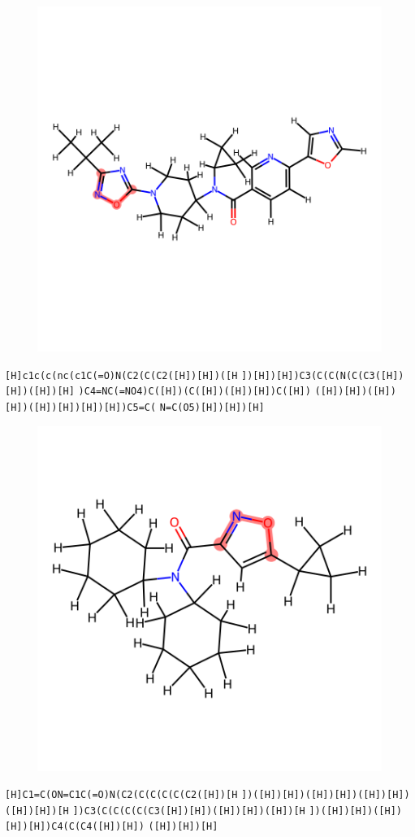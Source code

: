 \documentclass{article}
\begin{document}
\begin{figure}[ht]
\centering
    \includegraphics{mol274.png}
\end{figure}
\verb|[H]c1c(c(nc(c1C(=O)N(C2(C(C2([H])[H])([H| \verb|])[H])[H])C3(C(C(N(C(C3([H])[H])([H])[H]| \verb|)C4=NC(=NO4)C([H])(C([H])([H])[H])C([H])| \verb|([H])[H])([H])[H])([H])[H])[H])[H])C5=C(| \verb|N=C(O5)[H])[H])[H]|

\begin{figure}[ht]
\centering
    \includegraphics{mol275.png}
\end{figure}
\verb|[H]C1=C(ON=C1C(=O)N(C2(C(C(C(C(C2([H])[H| \verb|])([H])[H])([H])[H])([H])[H])([H])[H])[H| \verb|])C3(C(C(C(C(C3([H])[H])([H])[H])([H])[H| \verb|])([H])[H])([H])[H])[H])C4(C(C4([H])[H])| \verb|([H])[H])[H]|
\end{document}
